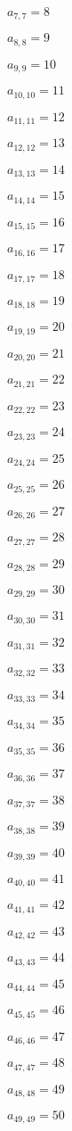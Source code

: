 \documentclass[a4paper,12pt]{article}
\begin{document}
$a _{ 7, 7 } = 8$

$a _{ 8, 8 } = 9$

$a _{ 9, 9 } = 10$

$a _{ 10, 10 } = 11$

$a _{ 11, 11 } = 12$

$a _{ 12, 12 } = 13$

$a _{ 13, 13 } = 14$

$a _{ 14, 14 } = 15$

$a _{ 15, 15 } = 16$

$a _{ 16, 16 } = 17$

$a _{ 17, 17 } = 18$

$a _{ 18, 18 } = 19$

$a _{ 19, 19 } = 20$

$a _{ 20, 20 } = 21$

$a _{ 21, 21 } = 22$

$a _{ 22, 22 } = 23$

$a _{ 23, 23 } = 24$

$a _{ 24, 24 } = 25$

$a _{ 25, 25 } = 26$

$a _{ 26, 26 } = 27$

$a _{ 27, 27 } = 28$

$a _{ 28, 28 } = 29$

$a _{ 29, 29 } = 30$

$a _{ 30, 30 } = 31$

$a _{ 31, 31 } = 32$

$a _{ 32, 32 } = 33$

$a _{ 33, 33 } = 34$

$a _{ 34, 34 } = 35$

$a _{ 35, 35 } = 36$

$a _{ 36, 36 } = 37$

$a _{ 37, 37 } = 38$

$a _{ 38, 38 } = 39$

$a _{ 39, 39 } = 40$

$a _{ 40, 40 } = 41$

$a _{ 41, 41 } = 42$

$a _{ 42, 42 } = 43$

$a _{ 43, 43 } = 44$

$a _{ 44, 44 } = 45$

$a _{ 45, 45 } = 46$

$a _{ 46, 46 } = 47$

$a _{ 47, 47 } = 48$

$a _{ 48, 48 } = 49$

$a _{ 49, 49 } = 50$
\end{document}
